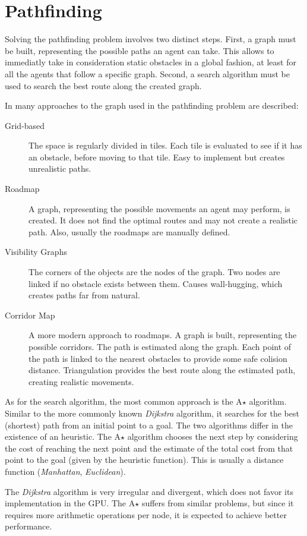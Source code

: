 \section{Pathfinding}

Solving the pathfinding problem involves two distinct steps.
First, a graph must be built, representing the possible paths an agent can take.
This allows to immediatly take in consideration static obstacles in a global fashion, at least for all the agents that follow a specific graph.
Second, a search algorithm must be used to search the best route along the created graph.

In \cite{johansson09} many approaches to the graph used in the pathfinding problem are described:
\begin{description}
	\item [Grid-based] The space is regularly divided in tiles. Each tile is evaluated to see if it has an obstacle, before moving to that tile. Easy to implement but creates unrealistic paths.
	\item [Roadmap] A graph, representing the possible movements an agent may perform, is created. It does not find the optimal routes and may not create a realistic path. Also, usually the roadmaps are manually defined.
	\item [Visibility Graphs] The corners of the objects are the nodes of the graph. Two nodes are linked if no obstacle exists between them. Causes wall-hugging, which creates paths far from natural.
	\item [Corridor Map] A more modern approach to roadmaps. A graph is built, representing the possible corridors. The path is estimated along the graph. Each point of the path is linked to the nearest obstacles to provide some safe colision distance. Triangulation provides the best route along the estimated path, creating realistic movements. 
\end{description}

As for the search algorithm, the most common approach is the A$\star$ algorithm.
Similar to the more commonly known \textit{Dijkstra} algorithm, it searches for the best (shortest) path from an initial point to a goal.
The two algorithms differ in the existence of an heuristic.
The A$\star$ algorithm chooses the next step by considering the cost of reaching the next point and the estimate of the total cost from that point to the goal (given by the heuristic function).
This is usually a distance function (\textit{Manhattan}, \textit{Euclidean}).

The \textit{Dijkstra} algorithm is very irregular and divergent, which does not favor its implementation in the GPU.
The A$\star$ suffers from similar problems, but since it requires more arithmetic operations per node, it is expected to achieve better performance.